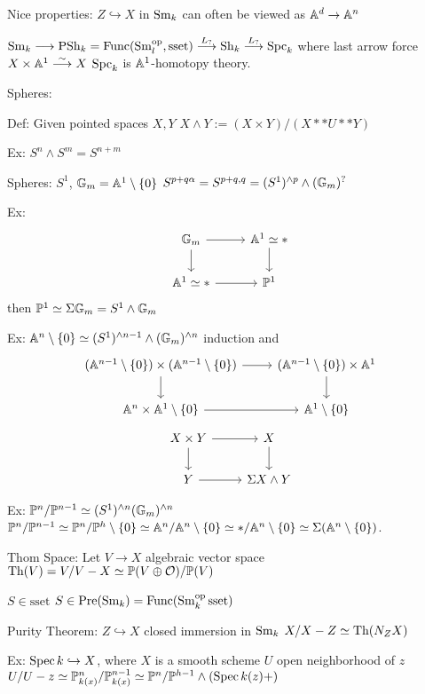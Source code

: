 Nice properties: $Z \hookrightarrow X$ in $\operatorname{Sm}_k$ can often be viewed as $\mathbb{A}^d \to \mathbb{A}^n$



$\operatorname{Sm}_k \stackrel{}{\longrightarrow} \operatorname{PSh}_k= \operatorname{Func}(\operatorname{Sm}_l^\text{op}, \text{sset}) \stackrel{L_?}{\longrightarrow} \operatorname{Sh}_k \stackrel{L_?}{\longrightarrow} \operatorname{Spc}_k$
where last arrow force $X \times \mathbb{A}^1 \stackrel{\sim}{\longrightarrow} X$
$\operatorname{Spc}_k$ is $\mathbb{A}^1$-homotopy theory. 



Spheres:

Def: Given pointed spaces $X,Y$ $X \wedge Y:= (X \times Y)/(X ** U ** Y)$

Ex: $S^n \wedge S^m= S^{n+m}$

Spheres: $S^1$, $\mathbb{G}_m= \mathbb{A}^1 \setminus \{0\}$
$S^{p+q\alpha}= S^{p+q,q}= (S^1)^{\wedge p} \wedge (\mathbb{G}_m)^?$

Ex:
	\[
	\begin{tikzcd}
	\G_m \arrow{r} \arrow{d} & \A^1 \simeq * \arrow{d} \\
	\A^1 \simeq * \arrow{r} & \P^1
	\end{tikzcd}
	\]
then $\mathbb{P}^1 \simeq \Sigma \mathbb{G}_m = S^1 \wedge \mathbb{G}_m$


Ex: $\mathbb{A}^n \setminus \{0\} \simeq (S^1)^{\wedge n-1} \wedge (\mathbb{G}_m)^{\wedge n}$
induction and 
	\[
	\begin{tikzcd}
	(\A^{n-1} \setminus \{0\}) \times (\A^{n-1} \setminus \{0\}) \arrow{r} \arrow{d} & (\A^{n-1} \setminus \{0\}) \times \A^1 \arrow{d} \\ 
	\A^n \times \A^1 \setminus \{0\} \arrow{r} &  \A^1 \setminus \{0\}
	\end{tikzcd}
	\]
	\[
	\begin{tikzcd}
	X \times Y \arrow{r} \arrow{d} & X \arrow{d} \\ 
	Y \arrow{r} &  \Sigma X \wedge Y
	\end{tikzcd}
	\]


Ex: $\mathbb{P}^n/\mathbb{P}^{n-1} \simeq (S^1)^{\wedge n} (\mathbb{G}_m)^{\wedge n}$
$\mathbb{P}^n/\mathbb{P}^{n-1} \simeq \mathbb{P}^n/\mathbb{P}^h \setminus \{0\} \simeq \mathbb{A}^n/\mathbb{A}^n \setminus \{0\} \simeq */\mathbb{A}^n \setminus \{0\} \simeq \Sigma (\mathbb{A}^n \setminus \{0\})$.


Thom Space: Let $V \to X$ algebraic vector space
$\text{Th}(V)= V/V-X \simeq \mathbb{P}(V\oplus \mathcal{O})/\mathbb{P}(V)$


$S \in \text{sset}$
$S \in \operatorname{Pre}(\operatorname{Sm}_k)= \operatorname{Func}(\operatorname{Sm}_k^\text{op} \text{sset})$


Purity Theorem: 
$Z \hookrightarrow X$ closed immersion in $\operatorname{Sm}_k$
$X/X-Z \simeq \text{Th}(N_ZX)$

Ex: $\operatorname{Spec} k \hookrightarrow X$, where $X$ is a smooth scheme
$U$ open neighborhood of $z$
$U/U-z \simeq \mathbb{P}^n_{k(x)}/\mathbb{P}^{n-1}_{k(x)} \simeq \mathbb{P}^n/\mathbb{P}^{h-1} \wedge (\operatorname{Spec} k(z)+)$

